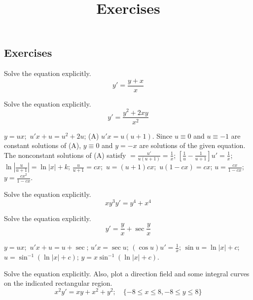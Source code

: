 \documentclass{ximera}
\title{Exercises} \license{CC BY-NC-SA 4.0}
\begin{document}
\begin{abstract}
\end{abstract}
\maketitle

\begin{onlineOnly}
\section*{Exercises}
\end{onlineOnly}

\begin{problem}\label{exer:2.4.15} Solve the equation explicitly.
$$y'=\frac{y+x}{x}$$
\end{problem}

\begin{problem}\label{exer:2.4.16} Solve the equation explicitly.
$$y'=\frac{y^2+2xy}{x^2}$$



\begin{solution}
    $y=ux$;\ $u'x+u=u^2+2u$;\;
(A) $u'x=u(u+1)$. Since $u\equiv0$ and $u\equiv-1$ are constant
solutions of (A), $y\equiv0$ and $y=-x$ are
solutions of the given equation. The nonconstant solutions of (A)
satisfy
$=\frac{u'}{ u(u+1)}=\frac{1}{ x}$;\;
$\left[\frac{1}{ u}-\frac{1}{ u+1}\right]u'=\frac{1}{ x}$;\;
$\ln\left|\frac{u}{ u+1}\right|=\ln|x|+k$;\;
$\frac{u}{ u+1}=cx$;\ $u=(u+1)cx$;\ $u(1-cx)=cx$;\;
$u=\frac{cx}{1-cx}$;\;
$y=\frac{cx^2}{1-cx}$.
\end{solution}
\end{problem}

\begin{problem}\label{exer:2.4.17} Solve the equation explicitly.
$$xy^3y'=y^4+x^4$$ 
\end{problem}

 \begin{problem}\label{exer:2.4.18} Solve the equation explicitly.
 $$y'=\frac{y}{x}+\sec\frac{y}{x}$$

 

 \begin{solution}
     $y=ux$;\ $u'x+u=u+\sec$;\;
$u'x=\sec u$;\;
$(\cos u)u'=\frac{1}{ x}$;\;
$\sin u=\ln|x|+c$;\;
$u=\sin^{-1}(\ln|x|+c)$;\;
$y=x\sin^{-1}(\ln|x|+c)$.
 \end{solution}
\end{problem}

\begin{problem}\label{exer:2.4.19} Solve the equation explicitly.  Also, plot a direction field and some integral curves on the indicated rectangular region.
$$x^2y'=xy+x^2+y^2;   \quad \{-8\leq x\leq 8,-8\leq y\leq 8\}$$
\end{problem}
\end{document}
